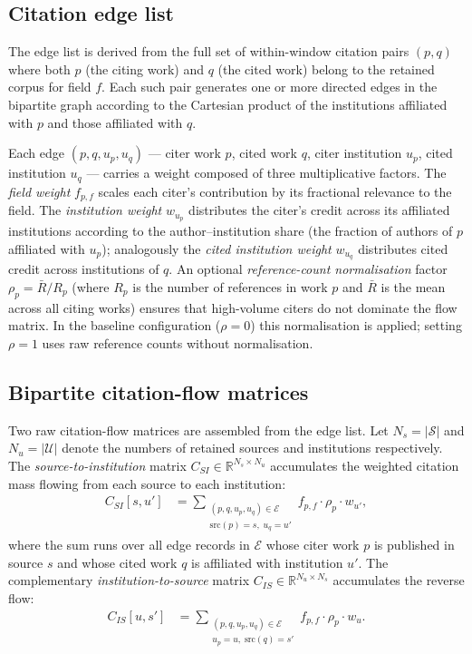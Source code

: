 \subsection{Citation edge list}

The edge list is derived from the full set of within-window citation pairs
$(p, q)$ where both $p$ (the citing work) and $q$ (the cited work) belong to
the retained corpus for field $f$.  Each such pair generates one or more
directed edges in the bipartite graph according to the Cartesian product of
the institutions affiliated with $p$ and those affiliated with $q$.

Each edge $(p, q, u_p, u_q)$ — citer work $p$, cited work $q$, citer
institution $u_p$, cited institution $u_q$ — carries a weight composed of
three multiplicative factors.  The \emph{field weight} $f_{p,f}$ scales each
citer's contribution by its fractional relevance to the field.  The
\emph{institution weight} $w_{u_p}$ distributes the citer's credit across its
affiliated institutions according to the author--institution share (the
fraction of authors of $p$ affiliated with $u_p$); analogously the
\emph{cited institution weight} $w_{u_q}$ distributes cited credit across
institutions of $q$.  An optional \emph{reference-count normalisation} factor
$\rho_p = \bar{R}/R_p$ (where $R_p$ is the number of references in work $p$
and $\bar{R}$ is the mean across all citing works) ensures that high-volume
citers do not dominate the flow matrix.  In the baseline configuration ($\rho
= 0$) this normalisation is applied; setting $\rho = 1$ uses raw reference
counts without normalisation.

\subsection{Bipartite citation-flow matrices}

Two raw citation-flow matrices are assembled from the edge list.  Let $N_s =
|\mathcal{S}|$ and $N_u = |\mathcal{U}|$ denote the numbers of retained
sources and institutions respectively.  The \emph{source-to-institution} matrix
$C_{SI} \in \mathbb{R}^{N_s \times N_u}$ accumulates the weighted citation
mass flowing from each source to each institution:
\begin{align}
  C_{SI}[s, u'] &= \sum_{\substack{(p,q,u_p,u_q) \in \mathcal{E} \\
                   \mathrm{src}(p)=s,\;u_q=u'}} \!\!
                   f_{p,f} \cdot \rho_p \cdot w_{u'},
  \label{eq:csi}
\end{align}
where the sum runs over all edge records in $\mathcal{E}$ whose citer work $p$
is published in source $s$ and whose cited work $q$ is affiliated with
institution $u'$.  The complementary \emph{institution-to-source} matrix
$C_{IS} \in \mathbb{R}^{N_u \times N_s}$ accumulates the reverse flow:
\begin{align}
  C_{IS}[u, s'] &= \sum_{\substack{(p,q,u_p,u_q) \in \mathcal{E} \\
                   u_p=u,\;\mathrm{src}(q)=s'}} \!\!
                   f_{p,f} \cdot \rho_p \cdot w_u.
  \label{eq:cis}
\end{align}

